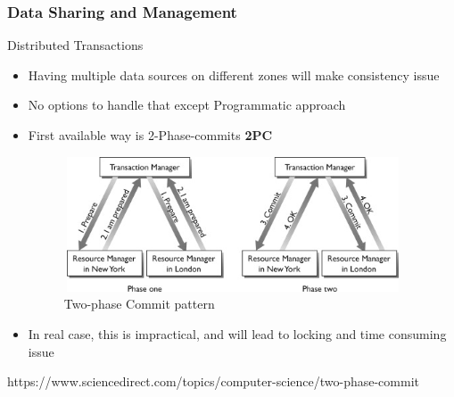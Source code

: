 \documentclass{beamer}
\begin{document}
	\begin{frame}
		\frametitle{Data Sharing and Management}
		Distributed Transactions \\
		\vspace{1mm}
			\begin{itemize}
				\item<1-> \scriptsize{Having multiple data sources on different zones will make consistency issue}
				\item<2-> \scriptsize{No options to handle that except Programmatic approach}
				\item<3-> \scriptsize{First available way is 2-Phase-commits \textbf{2PC}}
				\begin{figure}[h]
					\includegraphics[width=100mm,height= 40mm, scale=1]{img/2pc.jpg}
					\caption{Two-phase Commit pattern}
				\end{figure}
			\item<4-> \scriptsize{\alert{In real case, this is impractical, and will lead to locking and time consuming issue}}
			\end{itemize}
		\vspace{5mm}
		\tiny{https://www.sciencedirect.com/topics/computer-science/two-phase-commit}
	\end{frame}
\end{document}
